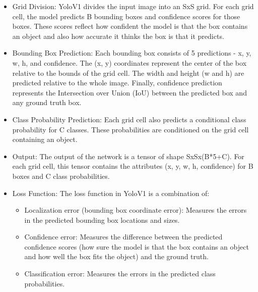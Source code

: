 \begin{itemize}
  \item Grid Division: YoloV1 divides the input image into an SxS grid. For each grid cell, the model predicts B bounding boxes and confidence scores for those boxes. These scores reflect how confident the model is that the box contains an object and also how accurate it thinks the box is that it predicts.
  \item Bounding Box Prediction: Each bounding box consists of 5 predictions - x, y, w, h, and confidence. The (x, y) coordinates represent the center of the box relative to the bounds of the grid cell. The width and height (w and h) are predicted relative to the whole image. Finally, confidence prediction represents the Intersection over Union (IoU) between the predicted box and any ground truth box.
  \item Class Probability Prediction: Each grid cell also predicts a conditional class probability for C classes. These probabilities are conditioned on the grid cell containing an object.
  \item Output: The output of the network is a tensor of shape SxSx(B*5+C). For each grid cell, this tensor contains the attributes (x, y, w, h, confidence) for B boxes and C class probabilities.
  \item Loss Function: The loss function in YoloV1 is a combination of:
        \begin{itemize}
          \item Localization error (bounding box coordinate error): Measures the errors in the predicted bounding box locations and sizes.
          \item Confidence error: Measures the difference between the predicted confidence scores (how sure the model is that the box contains an object and how well the box fits the object) and the ground truth.
          \item Classification error: Measures the errors in the predicted class probabilities.
        \end{itemize}
\end{itemize}

